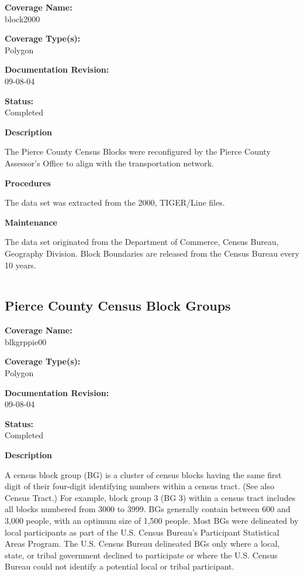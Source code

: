 {\bf \large Coverage Name:}\\
block2000

{\bf \large Coverage Type(s):}\\
Polygon

{\bf \large Documentation Revision:}\\
09-08-04

{\bf \large Status:}\\
Completed

{\bf \large Description}

The Pierce County Census Blocks were reconfigured by the Pierce
County Assessor's Office to align with the transportation network.

{\bf \large Procedures}

The data set was extracted from the 2000, TIGER/Line files.

{\bf \large Maintenance}

The data set originated from the Department of Commerce, Census
Bureau, Geography Division. Block Boundaries are released from the
Census Bureau every 10 years.

\begin{landscape}
\begin{longtable}{llrrrrrc}

\end{longtable}
\end{landscape}
\newpage

\subsection{Pierce County Census Block Groups}
{\bf \large Coverage Name:}\\
blkgrppie00

{\bf \large Coverage Type(s):}\\
Polygon

{\bf \large Documentation Revision:}\\
09-08-04

{\bf \large Status:}\\
Completed

{\bf \large Description}

A census block group (BG) is a cluster of census blocks having the
same first digit of their four-digit identifying numbers within a
census tract. (See also Census Tract.) For example, block group 3
(BG 3) within a census tract includes all blocks numbered from
3000 to 3999. BGs generally contain between 600 and 3,000 people,
with an optimum size of 1,500 people. Most BGs were delineated by
local participants as part of the U.S. Census Bureau's Participant
Statistical Areas Program. The U.S. Census Bureau delineated BGs
only where a local, state, or tribal government declined to
participate or where the U.S. Census Bureau could not identify a
potential local or tribal participant.

